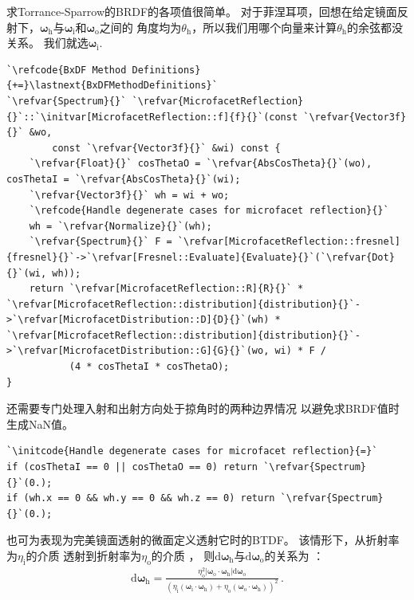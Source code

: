 求Torrance-Sparrow的BRDF的各项值很简单。
对于菲涅耳项，回想在给定镜面反射下，${\bm\omega}_{\mathrm{h}}$与${\bm\omega}_{\mathrm{i}}$和${\bm\omega}_{\mathrm{o}}$之间的
角度均为$\theta_{\mathrm{h}}$，所以我们用哪个向量来计算$\theta_{\mathrm{h}}$的余弦都没关系。
我们就选${\bm\omega}_{\mathrm{i}}$.
\begin{lstlisting}
`\refcode{BxDF Method Definitions}{+=}\lastnext{BxDFMethodDefinitions}`
`\refvar{Spectrum}{}` `\refvar{MicrofacetReflection}{}`::`\initvar[MicrofacetReflection::f]{f}{}`(const `\refvar{Vector3f}{}` &wo,
        const `\refvar{Vector3f}{}` &wi) const {
    `\refvar{Float}{}` cosThetaO = `\refvar{AbsCosTheta}{}`(wo), cosThetaI = `\refvar{AbsCosTheta}{}`(wi);
    `\refvar{Vector3f}{}` wh = wi + wo;
    `\refcode{Handle degenerate cases for microfacet reflection}{}`
    wh = `\refvar{Normalize}{}`(wh);
    `\refvar{Spectrum}{}` F = `\refvar[MicrofacetReflection::fresnel]{fresnel}{}`->`\refvar[Fresnel::Evaluate]{Evaluate}{}`(`\refvar{Dot}{}`(wi, wh));
    return `\refvar[MicrofacetReflection::R]{R}{}` * `\refvar[MicrofacetReflection::distribution]{distribution}{}`->`\refvar[MicrofacetDistribution::D]{D}{}`(wh) * `\refvar[MicrofacetReflection::distribution]{distribution}{}`->`\refvar[MicrofacetDistribution::G]{G}{}`(wo, wi) * F /
           (4 * cosThetaI * cosThetaO);
}
\end{lstlisting}
还需要专门处理入射和出射方向处于掠角时的两种边界情况
以避免求BRDF值时生成NaN值。
\begin{lstlisting}
`\initcode{Handle degenerate cases for microfacet reflection}{=}`
if (cosThetaI == 0 || cosThetaO == 0) return `\refvar{Spectrum}{}`(0.);
if (wh.x == 0 && wh.y == 0 && wh.z == 0) return `\refvar{Spectrum}{}`(0.);
\end{lstlisting}

也可为表现为完美镜面透射的微面定义透射它时的BTDF。
该情形下，从折射率为$\eta_{\mathrm{i}}$的介质
透射到折射率为$\eta_{\mathrm{o}}$的介质
，
则$\mathrm{d}{\bm\omega}_{\mathrm{h}}$与$\mathrm{d}{\bm\omega}_{\mathrm{o}}$的关系为
：
\begin{align*}
    \mathrm{d}{\bm\omega}_{\mathrm{h}}=\frac{\eta^2_{\mathrm{o}}
    |{\bm\omega}_{\mathrm{o}}\cdot{\bm\omega}_{\mathrm{h}}|\mathrm{d}{\bm\omega}_{\mathrm{o}}}
    {(\eta_{\mathrm{i}}({\bm\omega}_{\mathrm{i}}\cdot{\bm\omega}_{\mathrm{h}})
    +\eta_{\mathrm{o}}({\bm\omega}_{\mathrm{o}}\cdot{\bm\omega}_{\mathrm{h}}))^2}\, .
\end{align*}


